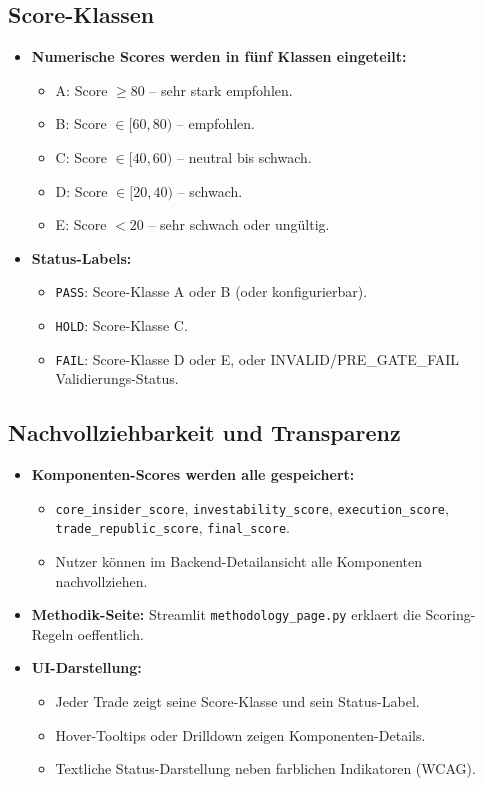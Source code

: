 \subsection{Score-Klassen}
\begin{itemize}
  \item \textbf{Numerische Scores werden in fünf Klassen eingeteilt:} %
    \begin{itemize}
      \item A: Score $\geq 80$ -- sehr stark empfohlen.
      \item B: Score $\in [60, 80)$ -- empfohlen.
      \item C: Score $\in [40, 60)$ -- neutral bis schwach.
      \item D: Score $\in [20, 40)$ -- schwach.
      \item E: Score $< 20$ -- sehr schwach oder ungültig.
    \end{itemize}
  \item \textbf{Status-Labels:} %
    \begin{itemize}
      \item \texttt{PASS}: Score-Klasse A oder B (oder konfigurierbar).
      \item \texttt{HOLD}: Score-Klasse C.
      \item \texttt{FAIL}: Score-Klasse D oder E, oder INVALID/PRE\_GATE\_FAIL Validierungs-Status.
    \end{itemize}
\end{itemize}

\subsection{Nachvollziehbarkeit und Transparenz}
\begin{itemize}
  \item \textbf{Komponenten-Scores werden alle gespeichert:} %
    \begin{itemize}
      \item \texttt{core\_insider\_score}, \texttt{investability\_score}, \texttt{execution\_score}, \texttt{trade\_republic\_score}, \texttt{final\_score}.
      \item Nutzer können im Backend-Detailansicht alle Komponenten nachvollziehen.
    \end{itemize}
  \item \textbf{Methodik-Seite:} Streamlit \texttt{methodology\_page.py} erklaert die Scoring-Regeln oeffentlich. %
  \item \textbf{UI-Darstellung:}
    \begin{itemize}
      \item Jeder Trade zeigt seine Score-Klasse und sein Status-Label.
      \item Hover-Tooltips oder Drilldown zeigen Komponenten-Details.
      \item Textliche Status-Darstellung neben farblichen Indikatoren (WCAG). %
    \end{itemize}
\end{itemize}


